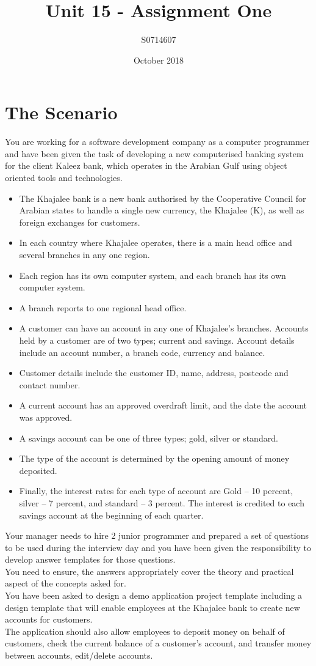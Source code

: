 \documentclass[twocolumn, twoside, titlepage]{article}
\title{Unit 15 - Assignment One}
\author{S0714607 }
\date{October 2018}
\begin{document}
\maketitle

\section{The Scenario}
You are working for a software development company as a computer programmer and have been given the task of developing a new computerised banking system for the client Kaleez bank, which operates in the Arabian Gulf using object oriented tools and technologies.  
\begin{itemize}
\item The Khajalee bank is a new bank authorised by the Cooperative Council for Arabian states to handle a single new currency, the Khajalee (K), as well as foreign exchanges for customers. 
\item In each country where Khajalee operates, there is a main head office and several branches in any one region. 
\item Each region has its own computer system, and each branch has its own computer system.
\item A branch reports to one regional head office.
\item A customer can have an account in any one of Khajalee’s branches. Accounts held by a customer are of two types; current and savings. Account details include an account number, a branch code, currency and balance.  
\item Customer details include the customer ID, name, address, postcode and contact number. 
\item A current account has an approved overdraft limit, and the date the account was approved.
\item A savings account can be one of three types; gold, silver or standard. 
\item The type of the account is determined by the opening amount of money deposited.
\item Finally, the interest rates for each type of account are Gold – 10 percent, silver – 7 percent, and standard – 3 percent. The interest is credited to each savings account at the beginning of each quarter.
\end{itemize}
Your manager needs to hire 2 junior programmer and prepared a set of questions to be used during the interview day and you have been given the responsibility to develop answer templates for those questions. 
\\You need to ensure, the answers appropriately cover the theory and practical aspect of the concepts asked for. 
\\You have been asked to design a demo application project template including a design template that will enable employees at the Khajalee bank to create new accounts for customers. \\ The application should also allow employees to deposit money on behalf of customers, check the current balance of a customer’s account, and transfer money between accounts, edit/delete accounts.
\clearpage
\end{document}
